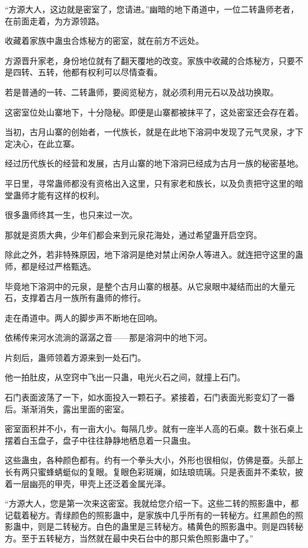 
\begin{this_body}

“方源大人，这边就是密室了，您请进。”幽暗的地下甬道中，一位二转蛊师老者，在前面走着，为方源领路。

收藏着家族中蛊虫合炼秘方的密室，就在前方不远处。

方源晋升家老，身份地位就有了翻天覆地的改变。家族中收藏的合炼秘方，只要不是四转、五转，他都有权利可以尽情查看。

若是普通的一转、二转蛊师，要阅览秘方，就必须利用元石以及战功换取。

这密室位处山寨地下，十分隐秘。即便是山寨都被抹平了，这处密室还会存在着。

当初，古月山寨的创始者，一代族长，就是在此地下溶洞中发现了元气灵泉，才下定决心，在此立寨。

经过历代族长的经营和发展，古月山寨的地下溶洞已经成为古月一族的秘密基地。

平日里，寻常蛊师都没有资格出入这里，只有家老和族长，以及负责把守这里的暗堂蛊师才能有这样的权利。

很多蛊师终其一生，也只来过一次。

那就是资质大典，少年们都会来到元泉花海处，通过希望蛊开启空窍。

除此之外，若非特殊原因，地下溶洞是绝对禁止闲杂人等进入。就连把守这里的蛊师，都是经过严格甄选。

毕竟地下溶洞中的元泉，是整个古月山寨的根基。从它泉眼中凝结而出的大量元石，支撑着古月一族所有蛊师的修行。

走在甬道中。两人的脚步声不断地在回响。

依稀传来河水流淌的潺潺之音——那是溶洞中的地下河。

片刻后，蛊师领着方源来到一处石门。

他一拍肚皮，从空窍中飞出一只蛊，电光火石之间，就撞上石门。

石门表面波荡了一下，如水面投入一颗石子。紧接着，石门表面光影变幻了一番后。渐渐消失，露出里面的密室。

密室面积并不小，有一亩大小。每隔几步。就有一座半人高的石桌。数十张石桌上摆着白玉盘子，盘子中往往静静地栖息着一只蛊虫。

这些蛊虫，各种颜色都有。约有一个拳头大小，外形也很相似，仿佛是蚕。头部上长有两只蜜蜂蜻蜓似的复眼。复眼色彩斑斓，如珐琅琉璃。只是表面并不柔软，披着一层幽亮的甲壳，甲壳上还泛着金属光泽。

“方源大人，您是第一次来这密室。我就给您介绍一下。这些二转的照影蛊中，都记载着秘方。青绿颜色的照影蛊中，是家族中几乎所有的一转秘方。红黑颜色的照影蛊中，则是二转秘方。白色的蛊里是三转秘方。橘黄色的照影蛊中。则是四转秘方。至于五转秘方，当然就在最中央石台中的那只紫色照影蛊中了。”


\end{this_body}
